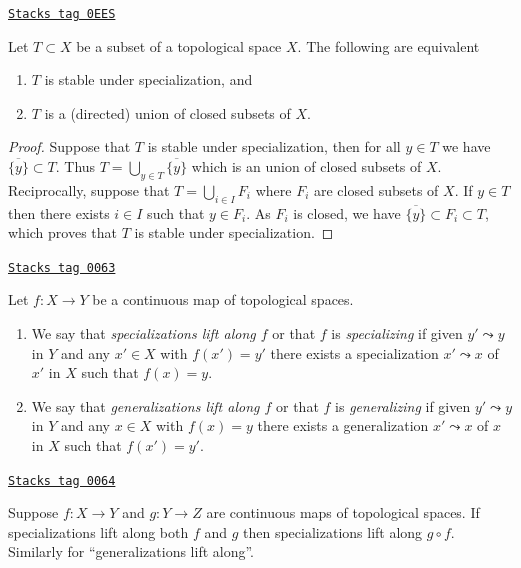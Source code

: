 \begin{lemma}
\label{topology-lemma-stable-specialization}
\href{https://stacks.math.columbia.edu/tag/0EES}{\texttt{Stacks tag 0EES}}

Let $T \subset X$ be a subset of a topological space $X$.
The following are equivalent
\begin{enumerate}
\item $T$ is stable under specialization, and
\item $T$ is a (directed) union of closed subsets of $X$.
\end{enumerate}
\end{lemma}

\begin{proof}
Suppose that $T$ is stable under specialization, then for all $y\in T$ we have
$\overline{\{y\}} \subset T$. Thus $T = \bigcup_{y\in T} \overline{\{y\}}$
which is an union of closed subsets of $X$. Reciprocally, suppose that $T =
\bigcup_{i\in I}F_i$ where $F_i$ are closed subsets of $X$. If $y\in T$ then
there exists $i\in I$ such that $y\in F_i$. As $F_i$ is closed, we have
$\overline{\{y\}} \subset F_i \subset T$, which proves that $T$ is stable under
specialization.
\end{proof}

\begin{definition}
\label{topology-definition-lift-specializations}
\href{https://stacks.math.columbia.edu/tag/0063}{\texttt{Stacks tag 0063}}

Let $f : X \to Y$ be a continuous map of topological spaces.
\begin{enumerate}
\item We say that {\it specializations lift along $f$} or that $f$ is
{\it specializing} if given $y' \leadsto y$ in $Y$ and any $x'\in X$ with
$f(x') = y'$ there exists a specialization $x' \leadsto x$ of $x'$ in $X$ such
that $f(x) = y$.
\item We say that {\it generalizations lift along $f$} or that $f$ is
{\it generalizing} if given $y' \leadsto y$ in $Y$ and any $x\in X$ with
$f(x) = y$ there exists a generalization $x' \leadsto x$ of $x$ in $X$ such
that $f(x') = y'$.
\end{enumerate}
\end{definition}

\begin{lemma}
\label{topology-lemma-lift-specialization-composition}
\href{https://stacks.math.columbia.edu/tag/0064}{\texttt{Stacks tag 0064}}

Suppose $f : X \to Y$ and $g : Y \to Z$ are continuous maps
of topological spaces. If specializations lift along both $f$ and $g$
then specializations lift along $g \circ f$. Similarly for
``generalizations lift along''.
\end{lemma}

